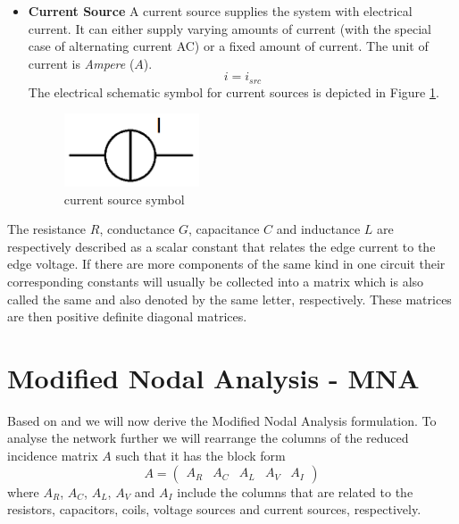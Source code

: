 \begin{itemize}
	\item \textbf{Current Source} \newline
	A current source supplies the system with electrical current. It can either supply varying amounts of current (with the special case of alternating current AC) or a fixed amount of current. The unit of current is \emph{Ampere} ($A$).
	\begin{equation}
		\label{eq:current source law}
		i = i_{src}
	\end{equation}
	The electrical schematic symbol for current sources is depicted in Figure \ref{fig:current source symbol}.
	\begin{figure}[H]
		\centering
		\includegraphics[width=4cm]{pictures/current_source.png}
		\caption{current source symbol}
		\label{fig:current source symbol}
	\end{figure}
\end{itemize}

The resistance $R$, conductance $G$, capacitance $C$ and inductance $L$ are respectively described as a scalar constant that relates the edge current to the edge voltage. If there are more components of the same kind in one circuit their corresponding constants will usually be collected into a matrix which is also called the same and also denoted by the same letter, respectively. These matrices are then positive definite diagonal matrices.

\section{Modified Nodal Analysis - MNA}
\label{sec:MNA}

Based on \cite{ModellingAndDiscretizationOfCircuitProblems} and \cite{NumerikGewöhnlicherDifferentialgleichungen} we will now derive the Modified Nodal Analysis formulation. To analyse the network further we will rearrange the columns of the reduced incidence matrix $A$ such that it has the block form
\begin{displaymath}
	A = 
	\begin{pmatrix}
		A_R & A_C & A_L & A_V & A_I
	\end{pmatrix}
\end{displaymath}
where $A_R$, $A_C$, $A_L$, $A_V$ and $A_I$ include the columns that are related to the resistors, capacitors, coils, voltage sources and current sources, respectively.

